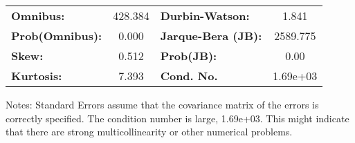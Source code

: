 \begin{center}
\begin{tabular}{lcccccc}
\bottomrule
\end{tabular}
\begin{tabular}{lclc}
\textbf{Omnibus:}       & 428.384 & \textbf{  Durbin-Watson:     } &    1.841  \\
\textbf{Prob(Omnibus):} &   0.000 & \textbf{  Jarque-Bera (JB):  } & 2589.775  \\
\textbf{Skew:}          &   0.512 & \textbf{  Prob(JB):          } &     0.00  \\
\textbf{Kurtosis:}      &   7.393 & \textbf{  Cond. No.          } & 1.69e+03  \\
\bottomrule
\end{tabular}
\end{center}

Notes: \newline
 [1] Standard Errors assume that the covariance matrix of the errors is correctly specified. \newline
 [2] The condition number is large, 1.69e+03. This might indicate that there are \newline
 strong multicollinearity or other numerical problems.